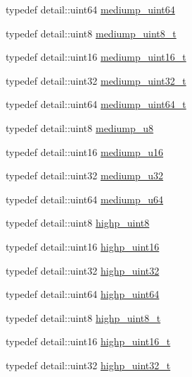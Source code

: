 \begin{CompactItemize}
\item 
typedef detail::uint64 \hyperlink{group__gtc__type__precision_g6685788d15d0a973ee7c2460d0456dc1}{mediump\_\-uint64}
\item 
typedef detail::uint8 \hyperlink{group__gtc__type__precision_gdfa38f3c245d371c4b2079f1fd68928b}{mediump\_\-uint8\_\-t}
\item 
typedef detail::uint16 \hyperlink{group__gtc__type__precision_g0b385466deac5ac96061ef2cdd6db20f}{mediump\_\-uint16\_\-t}
\item 
typedef detail::uint32 \hyperlink{group__gtc__type__precision_gc7782c1e393f9ad47e41a177a685f287}{mediump\_\-uint32\_\-t}
\item 
typedef detail::uint64 \hyperlink{group__gtc__type__precision_ga97354d3120a6dc029a5e9563723de18}{mediump\_\-uint64\_\-t}
\item 
typedef detail::uint8 \hyperlink{group__gtc__type__precision_gc04b372784392e82bd557f300c4de097}{mediump\_\-u8}
\item 
typedef detail::uint16 \hyperlink{group__gtc__type__precision_g6745262ef6a6fdb8637b2387ef924828}{mediump\_\-u16}
\item 
typedef detail::uint32 \hyperlink{group__gtc__type__precision_gd0c27a525045c299a92306eb4cd7c13a}{mediump\_\-u32}
\item 
typedef detail::uint64 \hyperlink{group__gtc__type__precision_g00c51a16fa190b0a90205d50d6d8a44a}{mediump\_\-u64}
\item 
typedef detail::uint8 \hyperlink{group__gtc__type__precision_g2c27c6dd26e893786f04b10f99c1ee95}{highp\_\-uint8}
\item 
typedef detail::uint16 \hyperlink{group__gtc__type__precision_g4d32967d45ba8365e2a05eaaac85e978}{highp\_\-uint16}
\item 
typedef detail::uint32 \hyperlink{group__gtc__type__precision_g3145e44c73e2df7dfe4f3cb65974bf22}{highp\_\-uint32}
\item 
typedef detail::uint64 \hyperlink{group__gtc__type__precision_g8079c653e20cda03d34b99de629a7b09}{highp\_\-uint64}
\item 
typedef detail::uint8 \hyperlink{group__gtc__type__precision_g9ba529fcc75b82d23da979f0ce6e4518}{highp\_\-uint8\_\-t}
\item 
typedef detail::uint16 \hyperlink{group__gtc__type__precision_g3145bc0ee80432c165e985a188a722b3}{highp\_\-uint16\_\-t}
\item 
typedef detail::uint32 \hyperlink{group__gtc__type__precision_g8eb85ad460079c63b68866ae34637bda}{highp\_\-uint32\_\-t}

\end{CompactItemize}

